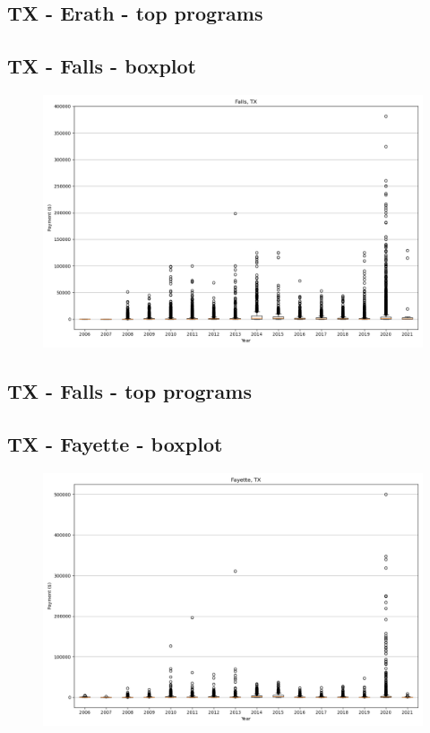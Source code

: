 \subsection*{TX - Erath - top programs}

\newpage
\subsection*{TX - Falls - boxplot}
\begin{figure}[h]
\centering
\includegraphics[width=7in]{../output/boxplots/counties/Falls-TX_boxplot.png}
\end{figure}


\subsection*{TX - Falls - top programs}

\newpage
\subsection*{TX - Fayette - boxplot}
\begin{figure}[h]
\centering
\includegraphics[width=7in]{../output/boxplots/counties/Fayette-TX_boxplot.png}
\end{figure}


